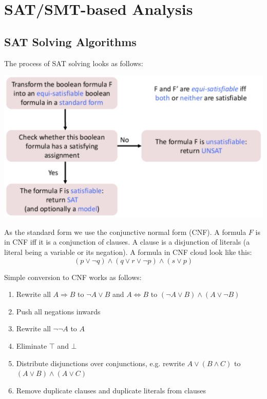 \section{SAT/SMT-based Analysis}


\subsection{SAT Solving Algorithms}

The process of SAT solving looks as follows:
\begin{center}
	\includegraphics[width=\columnwidth]{assets/sat_solving}
\end{center}

As the standard form we use the conjunctive normal form (CNF). A formula $F$ is in CNF iff it is a conjunction of clauses. A clause is a disjunction of literals (a literal being a variable or its negation). A formula in CNF cloud look like this:
$$(p \vee \neg q) \wedge (q \vee r \vee \neg p) \wedge (s \vee p)$$

Simple conversion to CNF works as follows:
\begin{enumerate}
	\item Rewrite all $A \Rightarrow B$ to $\neg A \vee B$ and $A \Leftrightarrow B$ to $(\neg A \vee B) \wedge (A \vee \neg B)$
	\item Push all negations inwards
	\item Rewrite all $\neg \neg A$ to $A$
	\item Eliminate $\top$ and $\bot$
	\item Distribute disjunctions over conjunctions, e.g. rewrite $A \vee (B \wedge C)$ to $(A \vee B) \wedge (A \vee C)$
	\item Remove duplicate clauses and duplicate literals from clauses
\end{enumerate}

